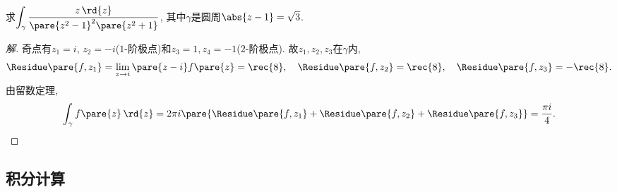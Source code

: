 \documentclass[../ComplexVariable.tex]{subfiles}
\begin{document}
\begin{sample}
    \begin{ex}
        求$\displaystyle \int_\gamma \frac{z\,\rd{z}}{\pare{z^2-1}^2\pare{z^2+1}}$, 其中$\gamma$是圆周$\abs{z-1} = \sqrt{3}$.
    \end{ex}
    \begin{proof}[解]
        奇点有$z_1 = i$, $z_2=-i$($1$-阶极点)和$z_3 = 1, z_4 = -1$($2$-阶极点). 故$z_1, z_2, z_3$在$\gamma$内,
        \[ \Residue\pare{f,z_1} = \lim_{z\rightarrow i}\pare{z-i}f\pare{z} = \rec{8},\quad \Residue\pare{f,z_2} = \rec{8}, \quad \Residue\pare{f,z_3} = -\rec{8}. \]
        由留数定理,
        \[ \int_\gamma f\pare{z}\,\rd{z} = 2\pi i\pare{\Residue\pare{f,z_1} + \Residue\pare{f,z_2} + \Residue\pare{f,z_3}} = \frac{\pi i}{4}. \qedhere \]
    \end{proof}
\end{sample}


\subsection{积分计算} %
\label{sub:积分计算}
\end{document}
